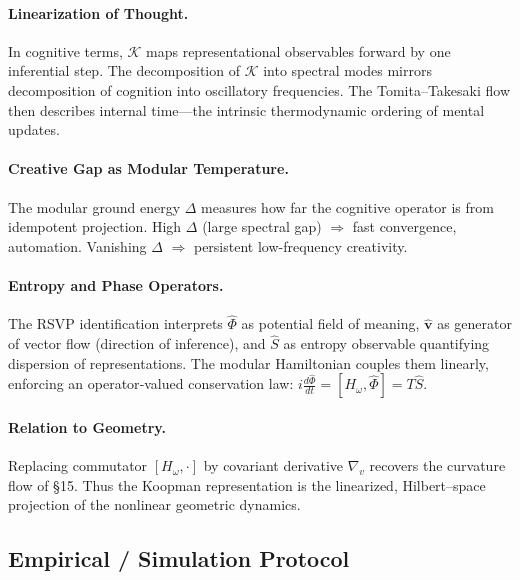 \documentclass[12pt,a4paper,twoside,openright]{book}
\begin{document}
\paragraph{Linearization of Thought.}
In cognitive terms, $\mathcal{K}$ maps representational observables forward by one inferential step.  
The decomposition of $\mathcal{K}$ into spectral modes mirrors decomposition of cognition into oscillatory frequencies.  
The Tomita--Takesaki flow then describes internal time—the intrinsic thermodynamic ordering of mental updates.

\paragraph{Creative Gap as Modular Temperature.}
The modular ground energy $\Delta$ measures how far the cognitive operator is from idempotent projection.  
High $\Delta$ (large spectral gap) $\Rightarrow$ fast convergence, automation.  
Vanishing $\Delta$ $\Rightarrow$ persistent low-frequency creativity.

\paragraph{Entropy and Phase Operators.}
The RSVP identification interprets $\widehat{\Phi}$ as potential field of meaning,  
$\widehat{\mathbf{v}}$ as generator of vector flow (direction of inference),  
and $\widehat{S}$ as entropy observable quantifying dispersion of representations.  
The modular Hamiltonian couples them linearly, enforcing an operator‐valued conservation law:
\(
i\frac{d\widehat{\Phi}}{dt}=[H_\omega,\widehat{\Phi}]=T\widehat{S}.
\)

\paragraph{Relation to Geometry.}
Replacing commutator $[H_\omega,\cdot]$ by covariant derivative $\nabla_v$ recovers the curvature flow of §15.  
Thus the Koopman representation is the linearized, Hilbert–space projection of the nonlinear geometric dynamics.

\subsection*{Empirical / Simulation Protocol}
\end{document}
